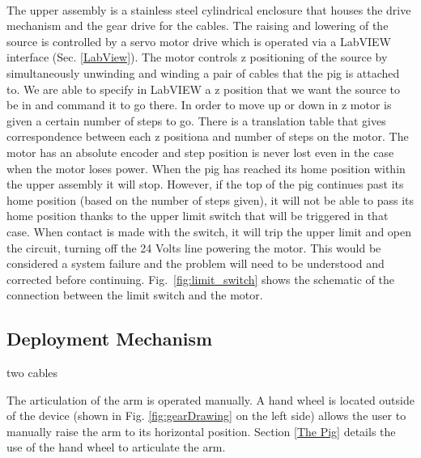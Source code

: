  \paragraph{}
  The upper assembly is a stainless steel cylindrical enclosure that houses the drive mechanism and the gear drive for the cables. The raising and lowering of the source is controlled by a servo motor drive which is operated via a LabVIEW interface (Sec. \ref{LabView}).  The motor controls z positioning of the source by simultaneously unwinding and winding a pair of cables  that the pig is attached to.  We are able to specify in LabVIEW a z position that we want the source to be in and command it to go there.  In order to move up or down in z motor is given a certain number of steps to go. There is a translation table that gives correspondence between each z positiona and number of steps on the motor. The motor has an absolute encoder and step position is never lost even in the case when the motor loses power. When the pig has reached its home position within the upper assembly it will stop.  However, if the top of the pig continues past its home position (based on the number of steps given), it will not be able to pass its home position thanks to the upper limit switch that will be triggered in that case. When contact is made with the switch, it will trip the upper limit and open the circuit, turning off the 24 Volts line powering the motor.  This would be considered a system failure and the problem will need to be understood and corrected before continuing.   
 Fig.~\ref{fig:limit_switch} shows the schematic of the connection between the limit switch and the motor.
 
  
     
 	

\subsection{Deployment Mechanism} 
two cables

 	
 	
  The articulation of the arm is operated manually.  A hand wheel is located outside of the device (shown in Fig. \ref{fig:gearDrawing} on the left side) allows the user to manually raise the arm to its horizontal position. Section \ref{The Pig} details the use of the hand wheel to articulate the arm.  





